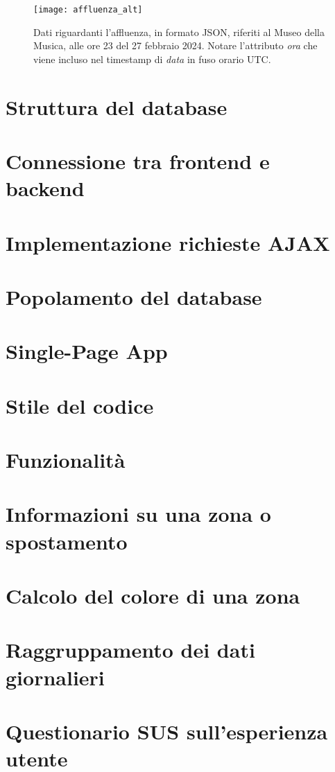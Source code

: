 \begin{figure}[H]
    \centering
    \texttt{[image: affluenza\_alt]}
    \caption[Struttura dei dati sull'affluenza]{Dati riguardanti l'affluenza, in formato JSON, riferiti al Museo della Musica, alle ore 23 del 27 febbraio 2024. Notare l'attributo \textit{ora} che viene incluso nel timestamp di \textit{data} in fuso orario UTC.}
\end{figure}

\section{Struttura del database}
\section{Connessione tra frontend e backend}
\section{Implementazione richieste AJAX}
\section{Popolamento del database}
\section{Single-Page App}
\section{Stile del codice}
\section{Funzionalità}
\section{Informazioni su una zona o spostamento}
\section{Calcolo del colore di una zona}
\section{Raggruppamento dei dati giornalieri}
\section{Questionario SUS sull'esperienza utente}